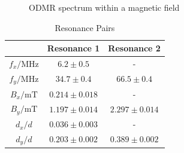 \begin{figure}
\begin{subfigure}{0.5\textwidth}
	\end{subfigure}
	\caption{ODMR spectrum within a magnetic field}
	\label{fig:odmr-magnet}
\end{figure}

\begin{table}
	\centering
	\begin{tabular}{c|c|c}
		&Resonance 1&Resonance 2\\\hline
		$f_x / \mathrm{MHz}$&$6.2\pm0.5$&-\\
		$f_y / \mathrm{MHz}$&$34.7\pm0.4$&$66.5\pm0.4$\\\hline
		$B_x / \mathrm{mT}$&$0.214\pm0.018$&-\\
		$B_y / \mathrm{mT}$&$1.197\pm0.014$&$2.297\pm0.014$\\\hline
		$d_x/d$&$0.036\pm0.003$&-\\
		$d_y/d$&$0.203\pm0.002$&$0.389\pm0.002$
	\end{tabular}
	\caption{Resonance Pairs}
\end{table}